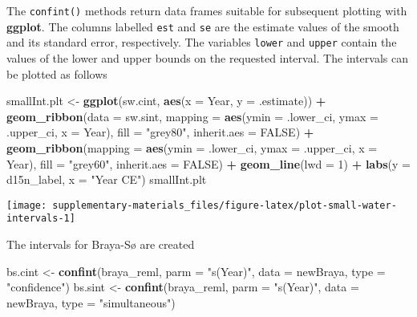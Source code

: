 \documentclass[12pt,]{article}
\newenvironment{Shaded}{\begin{snugshade}}{\end{snugshade}}
\newcommand{\DataTypeTok}[1]{\textcolor[rgb]{0.13,0.29,0.53}{#1}}
\newcommand{\DecValTok}[1]{\textcolor[rgb]{0.00,0.00,0.81}{#1}}
\newcommand{\KeywordTok}[1]{\textcolor[rgb]{0.13,0.29,0.53}{\textbf{#1}}}
\newcommand{\NormalTok}[1]{#1}
\newcommand{\OperatorTok}[1]{\textcolor[rgb]{0.81,0.36,0.00}{\textbf{#1}}}
\newcommand{\OtherTok}[1]{\textcolor[rgb]{0.56,0.35,0.01}{#1}}
\newcommand{\StringTok}[1]{\textcolor[rgb]{0.31,0.60,0.02}{#1}}
\begin{document}
The \texttt{confint()} methods return data frames suitable for
subsequent plotting with \textbf{ggplot}. The columns labelled
\texttt{est} and \texttt{se} are the estimate values of the smooth and
its standard error, respectively. The variables \texttt{lower} and
\texttt{upper} contain the values of the lower and upper bounds on the
requested interval. The intervals can be plotted as follows

\begin{Shaded}
\begin{Highlighting}[]
\NormalTok{smallInt.plt <-}\StringTok{ }\KeywordTok{ggplot}\NormalTok{(sw.cint, }\KeywordTok{aes}\NormalTok{(}\DataTypeTok{x =}\NormalTok{ Year, }\DataTypeTok{y =}\NormalTok{ .estimate)) }\OperatorTok{+}
\StringTok{    }\KeywordTok{geom_ribbon}\NormalTok{(}\DataTypeTok{data =}\NormalTok{ sw.sint,}
                \DataTypeTok{mapping =} \KeywordTok{aes}\NormalTok{(}\DataTypeTok{ymin =}\NormalTok{ .lower_ci, }\DataTypeTok{ymax =}\NormalTok{ .upper_ci, }\DataTypeTok{x =}\NormalTok{ Year),}
                \DataTypeTok{fill =} \StringTok{"grey80"}\NormalTok{, }\DataTypeTok{inherit.aes =} \OtherTok{FALSE}\NormalTok{) }\OperatorTok{+}
\StringTok{    }\KeywordTok{geom_ribbon}\NormalTok{(}\DataTypeTok{mapping =} \KeywordTok{aes}\NormalTok{(}\DataTypeTok{ymin =}\NormalTok{ .lower_ci, }\DataTypeTok{ymax =}\NormalTok{ .upper_ci, }\DataTypeTok{x =}\NormalTok{ Year),}
                \DataTypeTok{fill =} \StringTok{"grey60"}\NormalTok{, }\DataTypeTok{inherit.aes =} \OtherTok{FALSE}\NormalTok{) }\OperatorTok{+}
\StringTok{    }\KeywordTok{geom_line}\NormalTok{(}\DataTypeTok{lwd =} \DecValTok{1}\NormalTok{) }\OperatorTok{+}
\StringTok{    }\KeywordTok{labs}\NormalTok{(}\DataTypeTok{y =}\NormalTok{ d15n_label, }\DataTypeTok{x =} \StringTok{"Year CE"}\NormalTok{)}
\NormalTok{smallInt.plt}
\end{Highlighting}
\end{Shaded}

\begin{center}\texttt{[image: supplementary-materials\_files/figure-latex/plot-small-water-intervals-1]} \end{center}

The intervals for Braya-Sø are created

\begin{Shaded}
\begin{Highlighting}[]
\NormalTok{bs.cint <-}\StringTok{ }\KeywordTok{confint}\NormalTok{(braya_reml, }\DataTypeTok{parm =} \StringTok{"s(Year)"}\NormalTok{, }\DataTypeTok{data =}\NormalTok{ newBraya,}
                   \DataTypeTok{type =} \StringTok{"confidence"}\NormalTok{)}
\NormalTok{bs.sint <-}\StringTok{ }\KeywordTok{confint}\NormalTok{(braya_reml, }\DataTypeTok{parm =} \StringTok{"s(Year)"}\NormalTok{, }\DataTypeTok{data =}\NormalTok{ newBraya,}
                   \DataTypeTok{type =} \StringTok{"simultaneous"}\NormalTok{)}
\end{Highlighting}
\end{Shaded}
\end{document}
